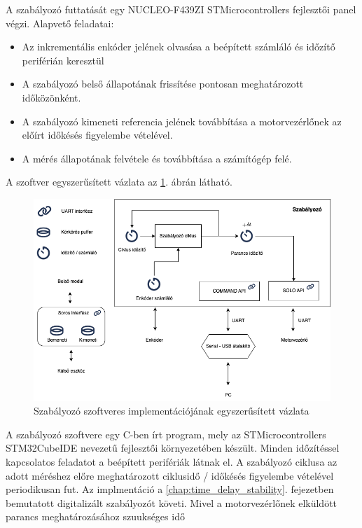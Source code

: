A szabályozó futtatását egy NUCLEO-F439ZI STMicrocontrollers fejlesztői panel végzi.
Alapvető feladatai:
\begin{itemize}
    \item Az inkrementális enkóder jelének olvasása a beépített számláló és időzítő periférián keresztül
    \item A szabályozó belső állapotának frissítése pontosan meghatározott időközönként.
    \item A szabályozó kimeneti referencia jelének továbbítása a motorvezérlőnek az előírt időkésés figyelembe vételével.
    \item A mérés állapotának felvétele és továbbítása a számítógép felé.
\end{itemize}
A szoftver egyszerűsített vázlata az \ref{fig:block_diagram_control_software}. ábrán látható. 
\begin{figure}[H]
    \begin{center}
    \includegraphics[width=14cm]{images/impedance_controler_software_diagram.png}
    \caption{Szabályozó szoftveres implementációjának egyszerűsített vázlata}\label{fig:block_diagram_control_software}
    \end{center}
\end{figure}
A szabályozó szoftvere egy C-ben írt program, mely az STMicrocontrollers STM32CubeIDE nevezetű 
fejlesztői környezetében készült. Minden időzítéssel kapcsolatos feladatot a beépített perifériák 
látnak el. A szabályozó ciklusa az adott méréshez előre meghatározott ciklusidő / időkésés figyelembe 
vételével periodikusan fut. Az implmentáció a \ref{chap:time_delay_stability}. fejezetben bemutatott 
digitalizált szabályozót követi. Mivel a motorvezérlőnek elküldött parancs meghatározásához szuukséges idő 
